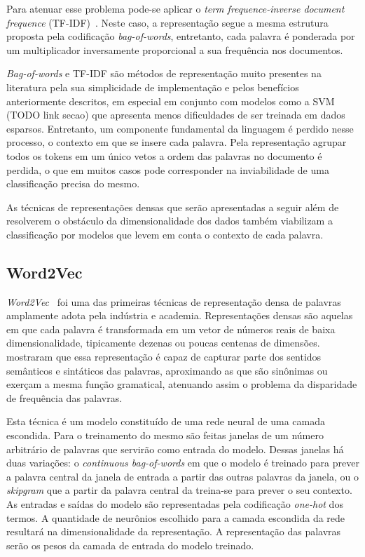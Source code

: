 
Para atenuar esse problema pode-se aplicar o \textit{term frequence-inverse
document frequence} (TF-IDF)~\cite{salton88}.
Neste caso, a representação segue a mesma estrutura proposta pela codificação
\textit{bag-of-words}, entretanto, cada palavra é ponderada por um multiplicador
inversamente proporcional a sua frequência nos documentos.


\textit{Bag-of-words} e TF-IDF são métodos de representação muito presentes na
literatura pela sua simplicidade de implementação e pelos benefícios
anteriormente descritos, em especial em conjunto com modelos como a SVM (TODO
link secao) que apresenta menos dificuldades de ser treinada em dados esparsos.
Entretanto, um componente fundamental da linguagem é perdido nesse processo, o
contexto em que se insere cada palavra.
Pela representação agrupar todos os tokens em um único vetos a ordem das
palavras no documento é perdida, o que em muitos casos pode corresponder na
inviabilidade de uma classificação precisa do mesmo.


As técnicas de representações densas que serão apresentadas a seguir além de
resolverem o obstáculo da dimensionalidade dos dados também viabilizam a
classificação por modelos que levem em conta o contexto de cada palavra.

\subsection{Word2Vec} \label{sec:w2v}

\textit{Word2Vec}~\cite{mikolov13} foi uma das primeiras técnicas de
representação densa de palavras amplamente adota pela indústria e academia.
Representações densas são aquelas em que cada palavra é transformada em um vetor
de números reais de baixa dimensionalidade, tipicamente dezenas ou poucas
centenas de dimensões.
\citet{mikolov13} mostraram que essa representação é capaz de capturar parte dos
sentidos semânticos e sintáticos das palavras, aproximando as que são sinônimas
ou exerçam a mesma função gramatical, atenuando assim o problema da disparidade
de frequência das palavras.

Esta técnica é um modelo constituído de uma rede neural de uma camada escondida.
Para o treinamento do mesmo são feitas janelas de um número arbitrário de
palavras que servirão como entrada do modelo.
Dessas janelas há duas variações: o \textit{continuous bag-of-words} em que
o modelo é treinado para prever a palavra central da janela de entrada a partir
das outras palavras da janela, ou o \textit{skipgram} que a partir da palavra
central da treina-se para prever o seu contexto.
As entradas e saídas do modelo são representadas pela codificação
\textit{one-hot} dos termos.
A quantidade de neurônios escolhido para a camada escondida da rede resultará na
dimensionalidade da representação.
A representação das palavras serão os pesos da camada de entrada do modelo
treinado.

